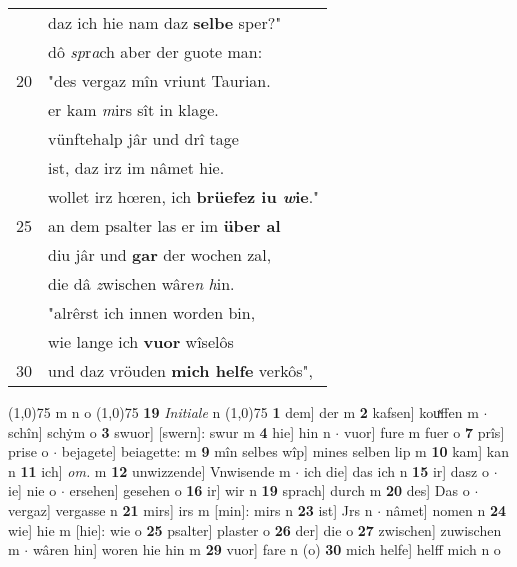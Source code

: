 \documentclass[8pt,a4paper,notitlepage]{article}
\begin{document}
\begin{table}[ht]
\begin{minipage}[t]{0.5\linewidth}
\begin{tabular}{rl}
 & daz ich hie nam daz \textbf{selbe} sper?"\\ 
 & dô \textit{sp}r\textit{a}ch aber der guote man:\\ 
20 & "des vergaz mîn vriunt Taurian.\\ 
 & er kam \textit{m}irs sît in klage.\\ 
 & vünftehalp jâr und drî tage\\ 
 & ist, daz irz im nâmet hie.\\ 
 & wollet irz hœren, ich \textbf{brüefez iu \textit{w}ie}."\\ 
25 & an dem psalter las er im \textbf{über al}\\ 
 & diu jâr und \textbf{gar} der wochen zal,\\ 
 & die dâ \textit{z}wischen wâre\textit{n} \textit{h}in.\\ 
 & "alrêrst ich innen worden bin,\\ 
 & wie lange ich \textbf{vuor} wîselôs\\ 
30 & und daz vröuden \textbf{mich helfe} verkôs",\\ 
\end{tabular}
\scriptsize
\line(1,0){75} \newline
m n o \newline
\line(1,0){75} \newline
\textbf{19} \textit{Initiale} n  \newline
\line(1,0){75} \newline
\textbf{1} dem] der m \textbf{2} kafsen] kouͯffen m  $\cdot$ schîn] schẏm o \textbf{3} swuor] [swern]: swur m \textbf{4} hie] hin n  $\cdot$ vuor] fure m fuer o \textbf{7} prîs] prise o  $\cdot$ bejagete] beiagette: m \textbf{9} mîn selbes wîp] mines selben lip m \textbf{10} kam] kan n \textbf{11} ich] \textit{om.} m \textbf{12} unwizzende] Vnwisende m  $\cdot$ ich die] das ich n \textbf{15} ir] dasz o  $\cdot$ ie] nie o  $\cdot$ ersehen] gesehen o \textbf{16} ir] wir n \textbf{19} sprach] durch m \textbf{20} des] Das o  $\cdot$ vergaz] vergasse n \textbf{21} mirs] irs m [min]: mirs n \textbf{23} ist] Jrs n  $\cdot$ nâmet] nomen n \textbf{24} wie] hie m [hie]: wie o \textbf{25} psalter] plaster o \textbf{26} der] die o \textbf{27} zwischen] zuwischen m  $\cdot$ wâren hin] woren hie hin m \textbf{29} vuor] fare n (o) \textbf{30} mich helfe] helff mich n o \newline
\end{minipage}
\end{table}
\newpage
\end{document}
